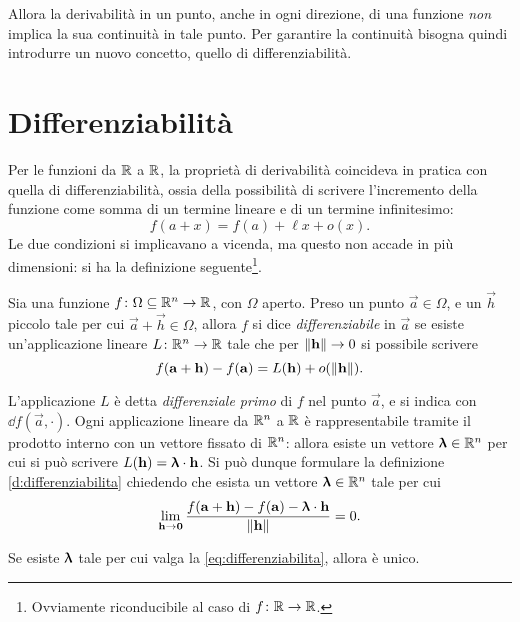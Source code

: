 Allora la derivabilità in un punto, anche in ogni direzione, di una funzione \emph{non} implica la sua continuità in tale punto. Per garantire la continuità bisogna quindi introdurre un nuovo concetto, quello di differenziabilità.

\section{Differenziabilità}
Per le funzioni da $\mathbb{R}$ a $\mathbb{R}$, la proprietà di derivabilità coincideva in pratica con quella di differenziabilità, ossia della possibilità di scrivere l'incremento della funzione come somma di un termine lineare e di un termine infinitesimo:
\[
f(a+x)=f(a)+\ell x+o(x).
\]
Le due condizioni si implicavano a vicenda, ma questo non accade in più dimensioni: si ha la definizione seguente\footnote{Ovviamente riconducibile al caso di $f\colon\mathbb{R}\to\mathbb{R}$.}.
\begin{definizione} \label{d:differenziabilita}
Sia una funzione $f\colon\Omega\subseteq\mathbb{R}^n\to\mathbb{R}$, con $\Omega$ aperto. Preso un punto $\vec a\in\Omega$, e un $\vec h$ piccolo tale per cui $\vec a+\vec h\in\Omega$, allora $f$ si dice \emph{differenziabile} in $\vec a$ se esiste un'applicazione lineare $L\colon\mathbb{R}^n\to\mathbb{R}$ tale che per $\left\|{\mathbf{h}}\right\|\to 0$ si possibile scrivere
\begin{equation} \label{eq:differenziabilita-app}
f(\mathbf{a}+\mathbf{h})-f(\mathbf{a})=L(\mathbf{h})+o(\left\|{\mathbf{h}}\right\|).
\end{equation}
\end{definizione}
L'applicazione $L$ è detta \emph{differenziale primo} di $f$ nel punto $\vec a$, e si indica con $\dd f(\vec a,\cdot)$.
Ogni applicazione lineare da $\mathbb{R}^n$ a $\mathbb{R}$ è rappresentabile %
tramite il prodotto interno con un vettore fissato di $\mathbb{R}^n$: allora esiste un vettore $\bm{\uplambda}\in\mathbb{R}^n$ per cui si può scrivere $L(\mathbf{h})={\bm{\uplambda}}\cdot{\mathbf{h}}$. Si può dunque formulare la definizione \ref{d:differenziabilita} chiedendo che esista un vettore $\bm{\uplambda}\in\mathbb{R}^n$ tale per cui
\begin{equation} \label{eq:differenziabilita}
\lim_{\mathbf{h}\to\mathbf{0}}\frac{f(\mathbf{a}+\mathbf{h})-f(\mathbf{a})-{\bm{\uplambda}}\cdot{\mathbf{h}}}{\left\|{\mathbf{h}}\right\|}=0.
\end{equation}
\begin{osservazione}
Se esiste $\bm{\uplambda}$ tale per cui valga la \eqref{eq:differenziabilita}, allora è unico.
\end{osservazione}
